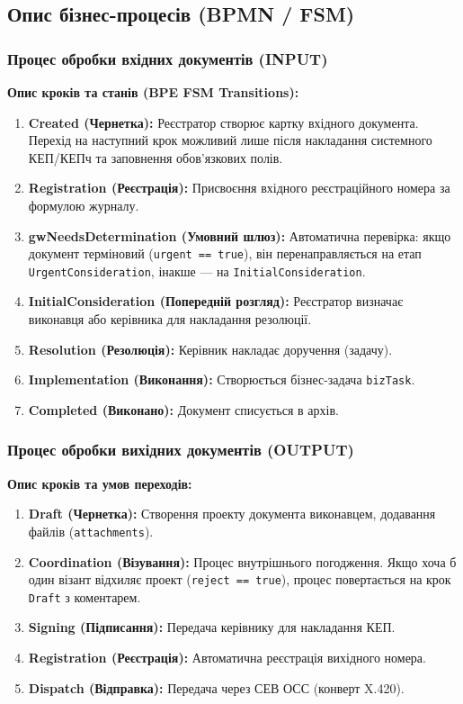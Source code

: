 \documentclass{article}
\begin{document}
\subsection{Опис бізнес-процесів (BPMN / FSM)}

\subsubsection{Процес обробки вхідних документів (INPUT)}
\textbf{Опис кроків та станів (BPE FSM Transitions):}
\begin{enumerate}
    \item \textbf{Created (Чернетка):} Реєстратор створює картку вхідного документа. Перехід на наступний крок можливий лише після накладання системного КЕП/КЕПч та заповнення обов'язкових полів.
    \item \textbf{Registration (Реєстрація):} Присвоєння вхідного реєстраційного номера за формулою журналу.
    \item \textbf{gwNeedsDetermination (Умовний шлюз):} Автоматична перевірка: якщо документ терміновий (\texttt{urgent == true}), він перенаправляється на етап \texttt{UrgentConsideration}, інакше --- на \texttt{InitialConsideration}.
    \item \textbf{InitialConsideration (Попередній розгляд):} Реєстратор визначає виконавця або керівника для накладання резолюції.
    \item \textbf{Resolution (Резолюція):} Керівник накладає доручення (задачу).
    \item \textbf{Implementation (Виконання):} Створюється бізнес-задача \texttt{bizTask}.
    \item \textbf{Completed (Виконано):} Документ списується в архів.
\end{enumerate}

\subsubsection{Процес обробки вихідних документів (OUTPUT)}
\textbf{Опис кроків та умов переходів:}
\begin{enumerate}
    \item \textbf{Draft (Чернетка):} Створення проекту документа виконавцем, додавання файлів (\texttt{attachments}).
    \item \textbf{Coordination (Візування):} Процес внутрішнього погодження. Якщо хоча б один візант відхиляє проект (\texttt{reject == true}), процес повертається на крок \texttt{Draft} з коментарем.
    \item \textbf{Signing (Підписання):} Передача керівнику для накладання КЕП.
    \item \textbf{Registration (Реєстрація):} Автоматична реєстрація вихідного номера.
    \item \textbf{Dispatch (Відправка):} Передача через СЕВ ОСС (конверт X.420).
\end{enumerate}
\end{document}
